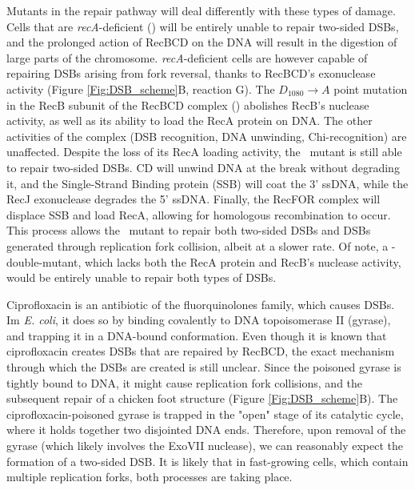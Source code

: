 Mutants in the repair pathway will deal differently with these types of damage. Cells that are \emph{recA}-deficient (\dreca) will be entirely unable to repair two-sided DSBs, and the prolonged action of RecBCD on the DNA will result in the digestion of large parts of the chromosome. \emph{recA}-deficient cells are however capable of repairing DSBs arising from fork reversal, thanks to RecBCD's exonuclease activity (Figure \ref{Fig:DSB_scheme}B, reaction G). The $D_{1080} \rightarrow A$ point mutation in the RecB subunit of the RecBCD complex (\teneighty) abolishes RecB's nuclease activity, as well as its ability to load the RecA protein on DNA. The other activities of the complex (DSB recognition, DNA unwinding, Chi-recognition) are unaffected. Despite the loss of its RecA loading activity, the \teneighty\ mutant is still able to repair two-sided DSBs. \teneighty CD will unwind DNA at the break without degrading it, and the Single-Strand Binding protein (SSB) will coat the 3' ssDNA, while the RecJ exonuclease degrades the 5' ssDNA. Finally, the RecFOR complex will displace SSB and load RecA, allowing for homologous recombination to occur. This process allows the \teneighty\ mutant to repair both two-sided DSBs and DSBs generated through replication fork collision, albeit at a slower rate. Of note, a \dreca-\teneighty double-mutant, which lacks both the RecA protein and RecB's nuclease activity, would be entirely unable to repair both types of DSBs.

Ciprofloxacin is an antibiotic of the fluor\-quinolones family, which causes DSBs. Im \emph{E. coli}, it does so by binding covalently to DNA topoisomerase II (gyrase), and trapping it in a DNA-bound conformation\cite{Kohanski2010}. Even though it is known that ciprofloxacin creates DSBs that are repaired by RecBCD, the exact mechanism through which the DSBs are created is still unclear. Since the poisoned gyrase is tightly bound to DNA, it might cause replication fork collisions, and the subsequent repair of a chicken foot structure (Figure \ref{Fig:DSB_scheme}B). The ciprofloxacin-poisoned gyrase is trapped in the "open" stage of its catalytic cycle, where it holds together two disjointed DNA ends. Therefore, upon removal of the gyrase (which likely involves the ExoVII nuclease), we can reasonably expect the formation of a two-sided DSB. It is likely that in fast-growing cells, which contain multiple replication forks, both processes are taking place.

